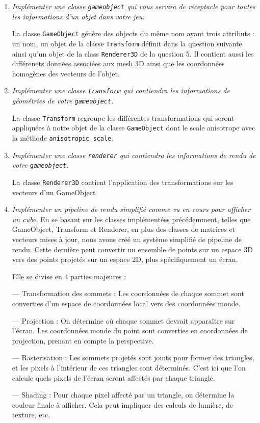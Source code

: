 \documentclass[a4paper,12pt]{article}
\begin{document}
\begin{enumerate}
  \item \emph{Implémenter une classe \texttt{gameobject} qui vous servira de réceptacle pour toutes les informations d'un objet dans votre jeu.}

  La classe \texttt{GameObject} génère des objects du même nom ayant trois attributs : un nom, un objet de la classe \texttt{Transform} définit dans la question suivante ainsi qu'un objet de la class \texttt{Renderer3D} de la question 5. Il contient aussi les différenets données associées aux mesh 3D ainsi que les coordonnées homogènes des vecteurs de l'objet.
  \newline
  

  \item \emph{Implémenter une classe \texttt{transform} qui contiendra les informations de géométries de votre \texttt{gameobject}.}
  

  La classe \texttt{Transform} regroupe les différentes transformations qui seront appliquées à notre objet de la classe \texttt{GameObject} dont le scale anisotrope avec la méthode \texttt{anisotropic\_scale}. \newline 


  \item \emph{Implémenter une classe \texttt{renderer} qui contiendra les informations de rendu de votre \texttt{gameobject}.}

  La classe \texttt{Renderer3D} contient l'application des transformations sur les vecteurs d'un GameObject  
  \newline


  \item \emph{Implémenter un pipeline de rendu simplifié comme vu en cours pour afficher un cube.}
  En se basant sur les classes implémentées précédemment, telles que GameObject, Transform et Renderer, en plus des classes de matrices et vecteurs mises à jour, nous avons créé un système simplifié de pipeline de rendu. Cette dernière peut convertir un ensemble de points sur un espace 3D vers des points projetés sur un espace 2D, plus spécifiquement un écran.

  Elle se divise en 4 parties majeures :

  — Transformation des sommets : Les coordonnées de chaque sommet sont converties d’un espace de coordonnées local vers des coordonnées monde.
  
  — Projection : On détermine où chaque sommet devrait apparaître sur l’écran. Les coordonnées monde du point sont converties en coordonnées de projection, prenant en compte la perspective.
  
  — Rasterisation : Les sommets projetés sont joints pour former des triangles, et les pixels à l’intérieur de ces triangles sont déterminés. C’est ici que l’on calcule quels pixels de l’écran seront affectés par chaque triangle.
  
  — Shading : Pour chaque pixel affecté par un triangle, on détermine la couleur finale à afficher. Cela peut impliquer des calculs de lumière, de texture, etc.\newline
\end{enumerate}
\end{document}
